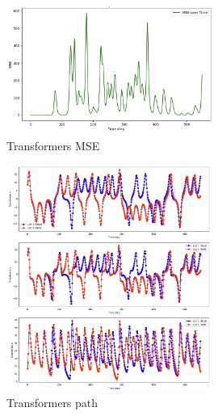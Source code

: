 \documentclass[11pt]{article}
\begin{document}
\begin{figure}[h]
\centering
\includegraphics[width=0.6\textwidth]{transformers_mse.jpeg}
\caption{Transformers MSE}
\end{figure}

\begin{figure}[h]
\centering
\includegraphics[width=0.6\textwidth]{transformers_path.jpeg}
\caption{Transformers path}
\end{figure}
\end{document}
